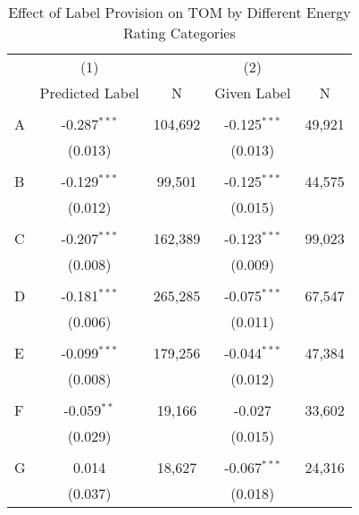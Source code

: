 \documentclass[12pt]{article}
\begin{document}
\clearpage
\newpage
\begin{table}[H]
\footnotesize
  \centering
  \caption{Effect of Label Provision on TOM by Different Energy Rating Categories}
      \begin{tabular}{lcccc}
\hline
                &\multicolumn{1}{c}{(1)}&&\multicolumn{1}{c}{(2)}&\\
& Predicted Label &N & Given Label	&N \\
\hline
&&&&\\
A &	-0.287$^{***}$ & 104,692 & -0.125$^{***}$ & 49,921  \\
& (0.013)	& &	(0.013)	& \\
&&&&\\
B	& -0.129$^{***}$ & 99,501 &	-0.125$^{***}$ & 44,575 \\
 & (0.012)	 & &  (0.015) & \\	
&&&&\\
C	& -0.207$^{***}$ & 162,389	& -0.123$^{***}$ & 99,023 \\
& (0.008)	& & (0.009) & \\
&&&&\\
D &	-0.181$^{***}$ & 265,285 & -0.075$^{***}$ & 67,547 \\
 & (0.006) & & (0.011) & \\	
&&&&\\
E & -0.099$^{***}$ & 179,256 &	-0.044$^{***}$ & 47,384 \\
& (0.008)	& & (0.012) & \\
&&&&\\
F	& -0.059$^{**}$ & 19,166	& -0.027 & 33,602 \\
& (0.029)	& & (0.015) & \\
&&&&\\	
G	& 0.014 & 18,627 & -0.067$^{***}$ & 24,316 \\
& (0.037)	& & (0.018) &	\\
\hline


\end{tabular}
\end{table}
\end{document}
